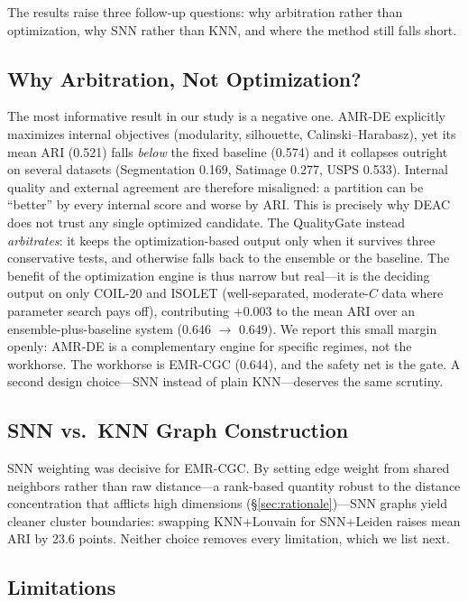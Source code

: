 \documentclass[journal]{IEEEtran}
\begin{document}
The results raise three follow-up questions: why arbitration rather than optimization, why SNN rather than KNN, and where the method still falls short.

\subsection{Why Arbitration, Not Optimization?}

The most informative result in our study is a negative one. AMR-DE
explicitly maximizes internal objectives (modularity, silhouette,
Calinski--Harabasz), yet its mean ARI (0.521) falls \emph{below} the fixed
baseline (0.574) and it collapses outright on several datasets
(Segmentation 0.169, Satimage 0.277, USPS 0.533). Internal quality and
external agreement are therefore misaligned: a partition can be ``better''
by every internal score and worse by ARI. This is precisely why DEAC does
not trust any single optimized candidate. The QualityGate instead
\emph{arbitrates}: it keeps the optimization-based output only when it
survives three conservative tests, and otherwise falls back to the
ensemble or the baseline. The benefit of the optimization engine is thus
narrow but real---it is the deciding output on only COIL-20 and ISOLET
(well-separated, moderate-$C$ data where parameter search pays off),
contributing $+0.003$ to the mean ARI over an ensemble-plus-baseline system
(0.646 $\to$ 0.649). We report this small margin openly: AMR-DE is a
complementary engine for specific regimes, not the workhorse. The workhorse
is EMR-CGC (0.644), and the safety net is the gate. A second design
choice---SNN instead of plain KNN---deserves the same scrutiny.

\subsection{SNN vs.\ KNN Graph Construction}

SNN weighting was decisive for EMR-CGC. By setting edge weight from shared neighbors rather than raw distance---a rank-based quantity robust to the distance concentration that afflicts high dimensions (\S\ref{sec:rationale})---SNN graphs yield cleaner cluster boundaries: swapping KNN+Louvain for SNN+Leiden raises mean ARI by 23.6 points. Neither choice removes every limitation, which we list next.

\subsection{Limitations}
\end{document}

